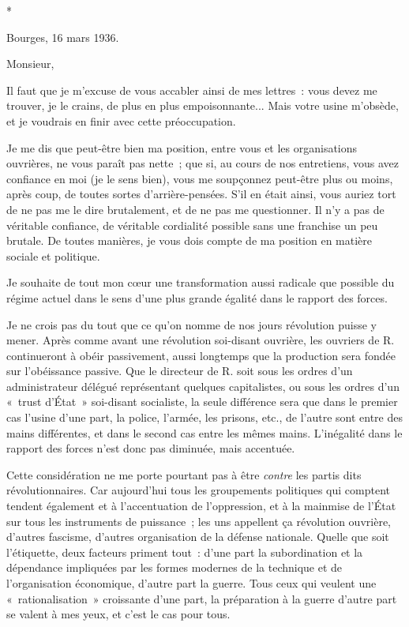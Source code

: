 \documentclass[french,twoside]{book} %
\begin{document}
\begin{center}
*\end{center}
\noindent Bourges, 16 mars 1936.\par
\noindent Monsieur,\par
Il faut que je m'excuse de vous accabler ainsi de mes lettres : vous devez me trouver, je le crains, de plus en plus empoisonnante... Mais votre usine m'obsède, et je voudrais en finir avec cette préoccupation.\par
Je me dis que peut-être bien ma position, entre vous et les organisations ouvrières, ne vous paraît pas nette ; que si, au cours de nos entretiens, vous avez confiance en moi (je le sens bien), vous me soupçonnez peut-être plus ou moins, après coup, de toutes sortes d'arrière-pensées. S'il en était ainsi, vous auriez tort de ne pas me le dire brutalement, et de ne pas me questionner. Il n'y a pas de véritable confiance, de véritable cordialité possible sans une franchise un peu brutale. De toutes manières, je vous dois compte de ma position en matière sociale et politique.\par
Je souhaite de tout mon cœur une transformation aussi radicale que possible du régime actuel dans le sens d'une plus grande égalité dans le rapport des forces.\par
Je ne crois pas du tout que ce qu'on nomme de nos jours révolution puisse y mener. Après comme avant une révolution soi-disant ouvrière, les ouvriers de R. continueront à obéir passivement, aussi longtemps que la production sera fondée sur l'obéissance passive. Que le directeur de R. soit sous les ordres d'un administrateur délégué représentant quelques capitalistes, ou sous les ordres d'un « trust d'État » soi-disant socialiste, la seule différence sera que dans le premier cas l'usine d'une part, la police, l'armée, les prisons, etc., de l'autre sont entre des mains différentes, et dans le second cas entre les mêmes mains. L'inégalité dans le rapport des forces n'est donc pas diminuée, mais accentuée.\par
\par
Cette considération ne me porte pourtant pas à être {\itshape contre} les partis dits révolutionnaires. Car aujourd'hui tous les groupements politiques qui comptent tendent également et à l'accentuation de l'oppression, et à la mainmise de l'État sur tous les instruments de puissance ; les uns appellent ça révolution ouvrière, d'autres fascisme, d'autres organisation de la défense nationale. Quelle que soit l'étiquette, deux facteurs priment tout : d'une part la subordination et la dépendance impliquées par les formes modernes de la technique et de l'organisation économique, d'autre part la guerre. Tous ceux qui veulent une « rationalisation » croissante d'une part, la préparation à la guerre d'autre part se valent à mes yeux, et c'est le cas pour tous.\par
\end{document}
